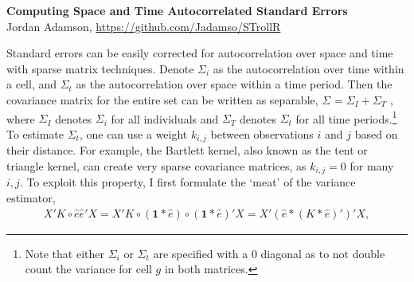 \RequirePackage{ASetup}


\begin{center}
\textbf{\Large{Computing Space and Time Autocorrelated Standard Errors}}\\
Jordan Adamson, \url{https://github.com/Jadamso/STrollR}
\end{center}
Standard errors can be easily corrected for autocorrelation over space and time with sparse matrix techniques. Denote $\Sigma_{i}$ as the autocorrelation over time within a cell, and $\Sigma_{t}$ as the autocorrelation over space within a time period. Then the covariance matrix for the entire set can be written as separable,
$\Sigma_{} = \Sigma_{I} + \Sigma_{T}$
, where $\Sigma_{I}$ denotes $\Sigma_{i}$ for all individuals and $\Sigma_{T}$ denotes $\Sigma_{t}$ for all time periods.\footnote{Note that either $\Sigma_{i}$ or $\Sigma_{t}$ are specified with a $0$ diagonal as to not double count the variance for cell $g$ in both matrices.} To estimate $\Sigma_{t}$,
one can use a weight $k_{i,j}$ between observations $i$ and $j$ based on their distance. For example, the Bartlett kernel, also known as the tent or triangle kernel, can create very sparse covariance matrices, as $k_{i,j}=0$ for many $i,j$. To exploit this property, I first formulate the `meat' of the variance estimator,
\begin{eqnarray*}
X' K \circ \hat{e} \hat{e}' X
= X' K \circ (\mathbf{1} * \hat{e}) \circ ( \mathbf{1} * \hat{e})' X
= X' (\hat{e} * (K * \hat{e})' )' X,
\end{eqnarray*}

